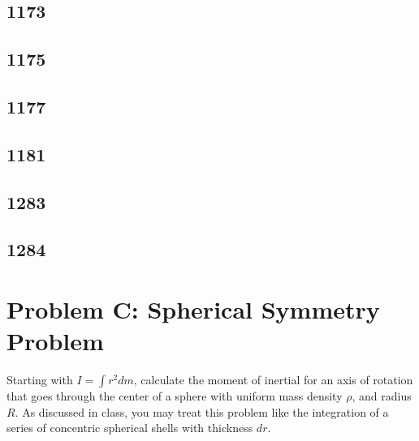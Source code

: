 \documentclass{article}
\begin{document}
\subsection{1173}

\subsection{1175}

\subsection{1177}

\subsection{1181}

\subsection{1283}

\subsection{1284}

\section{Problem C: Spherical Symmetry Problem}

Starting with $ I = \int r^2dm $, calculate the moment of inertial for an axis of rotation that goes through the center of a sphere with uniform mass density $ \rho $, and radius $ R $. As discussed in class, you may treat this problem like the integration of a series of concentric spherical shells with thickness $ dr $.
\end{document}
